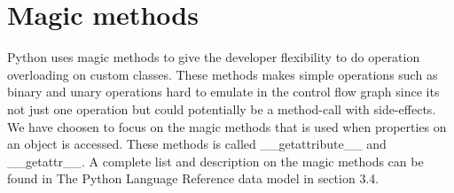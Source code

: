 \section{Magic methods}
Python uses magic methods to give the developer flexibility to do operation overloading on custom classes. These methods makes simple operations such as binary and unary operations hard to emulate in the control flow graph since its not just one operation but could potentially be a method-call with side-effects. \\
We have choosen to focus on the magic methods that is used when properties on an object is accessed. These methods is called \_\_getattribute\_\_ and \_\_getattr\_\_. A complete list and description on the magic methods can be found in The Python Language Reference data model\cite{pyref.datamodel} in section 3.4.
